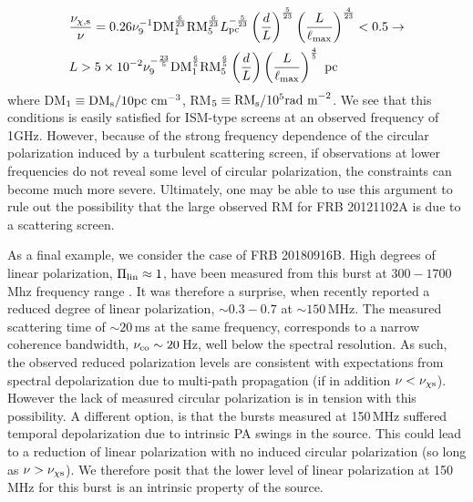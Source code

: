 \documentclass[fleqn,usenatbib]{mnras}
\begin{document}
	\begin{eqnarray}
		&  \frac{\nu_{\chi,\rm s}}{\nu}=0.26\nu_{9}^{-1}\mbox{DM}_1^{6\over 23}\mbox{RM}_5^{6\over 23}L_{\rm pc}^{-{5\over 23}}\left(\frac{d}{L}\right)^{5\over 23}\left(\frac{L}{\ell_{\rm max}}\right)^{4\over 23}<0.5 \rightarrow \nonumber \\
		& L>5\times 10^{-2} \nu_9^{-{23\over 5}}\mbox{DM}_1^{6\over 5}\mbox{RM}_5^{6\over 5}\left(\frac{d}{L}\right)\left(\frac{L}{\ell_{\rm max}}\right)^{4\over 5} \mbox{ pc}
	\end{eqnarray}
	where DM$_1\equiv \mbox{DM}_{\rm s}/10\mbox{pc cm}^{-3}$, RM$_5\equiv \mbox{RM}_{\rm s}/10^5\mbox{rad m}^{-2}$. We see that this conditions is easily satisfied for ISM-type screens at an observed frequency of 1GHz. However, because of the strong frequency dependence of the circular polarization induced by a turbulent scattering screen, if observations at lower frequencies do not reveal some level of circular polarization, the constraints can become much more severe. Ultimately, one may be able to use this argument to rule out the possibility that the large observed RM for FRB 20121102A is due to a scattering screen.
	
	
	As a final example, we consider the case of FRB 20180916B. High degrees of linear polarization, $\Pi_{\rm lin}\approx 1$, have been measured from this burst at $300-1700$\,Mhz frequency range \citep{CHIME2018,Chawla2020,Nimmo2021}. It was therefore a surprise, when \cite{Pleunis2021} recently reported a reduced degree of linear polarization, $\sim 0.3-0.7$ at $\sim 150$\,MHz. The measured scattering time of $\sim 20$\,ms at the same frequency, corresponds to a narrow coherence bandwidth, $\nu_{\rm co}\sim 20$\,Hz, well below the spectral resolution. As such, the observed reduced polarization levels are consistent with expectations from spectral depolarization due to multi-path propagation (if in addition $\nu<\nu_{\chi\rm s}$). However the lack of measured circular polarization is in tension with this possibility. A different option, is that the bursts measured at 150\,MHz suffered temporal depolarization due to intrinsic PA swings in the source. This could lead to a reduction of linear polarization with no induced circular polarization (so long as $\nu>\nu_{\chi\rm s}$). We therefore posit that the lower level of linear polarization at 150 MHz for this burst is an intrinsic property of the source.
	
\end{document}
